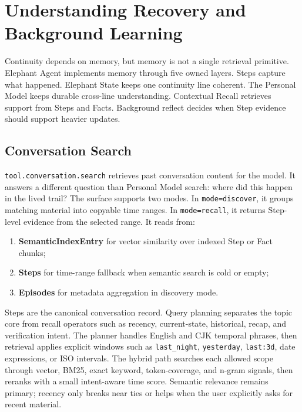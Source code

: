\section{Understanding Recovery and Background Learning}
\label{sec:understanding-recovery}

Continuity depends on memory, but memory is not a single retrieval primitive.
Elephant Agent implements memory through five owned layers. Steps capture what
happened. Elephant State keeps one continuity line coherent. The Personal Model
keeps durable cross-line understanding. Contextual Recall retrieves support
from Steps and Facts. Background reflect decides when Step evidence should
support heavier updates.

\subsection{Conversation Search}

\texttt{tool.conversation.search} retrieves past conversation content for the
model. It answers a different question than Personal Model search: where did
this happen in the lived trail? The surface supports two modes. In
\texttt{mode=discover}, it groups matching material into copyable time ranges.
In \texttt{mode=recall}, it returns Step-level evidence from the selected
range. It reads from:

\begin{enumerate}[leftmargin=*]
  \item \textbf{SemanticIndexEntry} for vector similarity over indexed Step or
  Fact chunks;
  \item \textbf{Steps} for time-range fallback when semantic search is cold or
  empty;
  \item \textbf{Episodes} for metadata aggregation in discovery mode.
\end{enumerate}

Steps are the canonical conversation record. Query planning separates the topic
core from recall operators such as recency, current-state, historical, recap,
and verification intent. The planner handles English and CJK temporal phrases,
then retrieval applies explicit windows such as \texttt{last\_night},
\texttt{yesterday}, \texttt{last:3d}, date expressions, or ISO intervals. The
hybrid path searches each allowed scope through vector, BM25, exact keyword,
token-coverage, and n-gram signals, then reranks with a small intent-aware time
score. Semantic relevance remains primary; recency only breaks near ties or
helps when the user explicitly asks for recent material.

